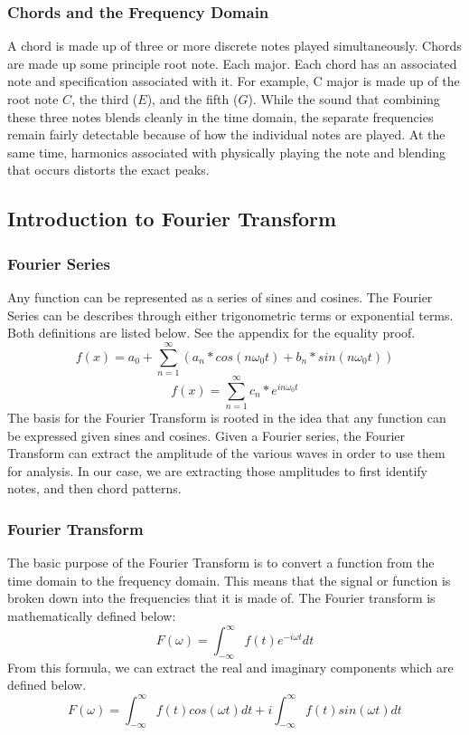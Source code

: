 \documentclass{article}
\begin{document}
\subsubsection{Chords and the Frequency Domain}
A chord is made up of three or more discrete notes played simultaneously. Chords are made up some principle root note. Each major. Each chord has an associated note and specification associated with it. For example, C major is made up of the root note $C$, the third ($E$), and the fifth ($G$). While the sound that combining these three notes blends cleanly in the time domain, the separate frequencies remain fairly detectable because of how the individual notes are played. At the same time, harmonics associated with physically playing the note and blending that occurs distorts the exact peaks.

\subsection{Introduction to Fourier Transform}
\subsubsection{Fourier Series}

Any function can be represented as a series of sines and cosines. The Fourier Series can be describes through either trigonometric terms or exponential terms. Both definitions are listed below. See the appendix for the equality proof. 
\begin{equation}
    f(x) = a_0 + \sum_{n=1}^{\infty}(a_n*cos(n\omega_0t) +b_n*sin(n\omega_0t))
\end{equation}
\begin{equation}
    f(x)=\sum_{n=1}^{\infty}c_n*e^{in\omega_0t}
\end{equation}
The basis for the Fourier Transform is rooted in the idea that any function can be expressed given sines and cosines. Given a Fourier series, the Fourier Transform can extract the amplitude of the various waves in order to use them for analysis. In our case, we are extracting those amplitudes to first identify notes, and then chord patterns.
\subsubsection{Fourier Transform}
The basic purpose of the Fourier Transform is to convert a function from the time domain to the frequency domain. This means that the signal or function is broken down into the frequencies that it is made of. The Fourier transform is mathematically defined below:
\begin{equation}
    F(\omega) = \int_{-\infty}^{\infty} f(t)e^{-i\omega t} dt
\end{equation}
From this formula, we can extract the real and imaginary components which are defined below.
\begin{equation}
    F(\omega) = \int_{-\infty}^{\infty} f(t)cos(\omega t) dt + i \int_{-\infty}^{\infty} f(t)sin(\omega t) dt
\end{equation}
\end{document}
